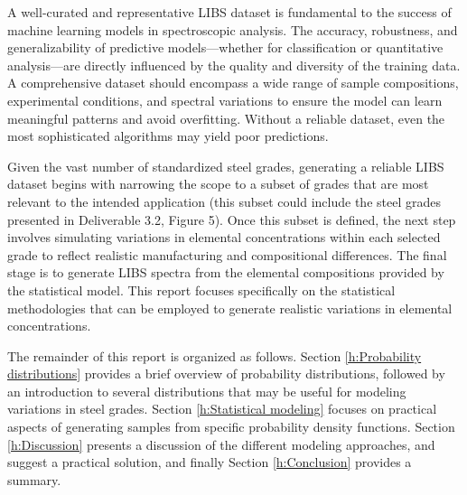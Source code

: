 \documentclass[12pt,a4paper]{article}
\begin{document}
	A well-curated and representative LIBS dataset is fundamental to the success of machine learning models in spectroscopic analysis. The accuracy, robustness, and generalizability of predictive models—whether for classification or quantitative analysis—are directly influenced by the quality and diversity of the training data. A comprehensive dataset should encompass a wide range of sample compositions, experimental conditions, and spectral variations to ensure the model can learn meaningful patterns and avoid overfitting. Without a reliable dataset, even the most sophisticated algorithms may yield poor predictions.
	
	Given the vast number of standardized steel grades, generating a reliable LIBS dataset begins with narrowing the scope to a subset of grades that are most relevant to the intended application (this subset could include the steel grades presented in Deliverable 3.2, Figure 5). Once this subset is defined, the next step involves simulating variations in elemental concentrations within each selected grade to reflect realistic manufacturing and compositional differences. The final stage is to generate LIBS spectra from the elemental compositions provided by the statistical model. This report focuses specifically on the statistical methodologies that can be employed to generate realistic variations in elemental concentrations.
	
	The remainder of this report is organized as follows. Section \ref{h:Probability distributions} provides a brief overview of probability distributions, followed by an introduction to several distributions that may be useful for modeling variations in steel grades. Section \ref{h:Statistical modeling} focuses on practical aspects of generating samples from specific probability density functions. Section \ref{h:Discussion} presents a discussion of the different modeling approaches, and suggest a practical solution, and finally Section \ref{h:Conclusion} provides a summary.

	
\end{document}
